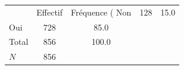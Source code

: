 {
\def\sym#1{\ifmmode^{#1}\else\(^{#1}\)\fi}
\begin{tabular}{l*{1}{cc}}
\toprule
            &    Effectif&Fréquence (%
\midrule
Non         &         128&        15.0\\
Oui         &         728&        85.0\\
Total       &         856&       100.0\\
\midrule
\(N\)       &         856&            \\
\bottomrule
\end{tabular}
}
